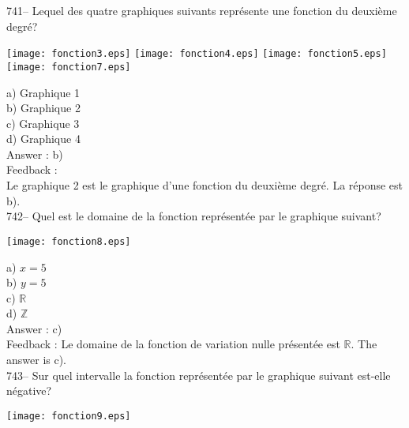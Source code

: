 ﻿\documentclass[letterpaper, 12pt]{article}
\begin{document}
741-- Lequel des quatre graphiques suivants repr\'esente une fonction du
deuxi\`eme degr\'e?\\
    \begin{center}
    \texttt{[image: fonction3.eps]}
\texttt{[image: fonction4.eps]}
\texttt{[image: fonction5.eps]}
\texttt{[image: fonction7.eps]}

    \end{center}
a) Graphique 1\\
b) Graphique 2\\
c) Graphique 3\\
d) Graphique 4\\

Answer : b)\\

Feedback : \\
Le graphique 2 est le graphique d'une fonction du deuxi\`eme degr\'e.  La
r\'eponse est b).\\

742-- Quel est le domaine de la fonction repr\'esent\'ee par le graphique
suivant?

    \begin{center}
    \texttt{[image: fonction8.eps]}
    \end{center}
a) $x=5$\\
b) $y=5$\\
c) $\mathbb{R}$\\
d) $\mathbb{Z}$\\

Answer : c)\\

Feedback :
Le domaine de la fonction de variation nulle pr\'esent\'ee est $\mathbb{R}$.
  The answer is c).\\

743-- Sur quel intervalle la fonction repr\'esent\'ee par le graphique
suivant est-elle n\'egative?\\

    \begin{center}
    \texttt{[image: fonction9.eps]}
    \end{center}
\end{document}
